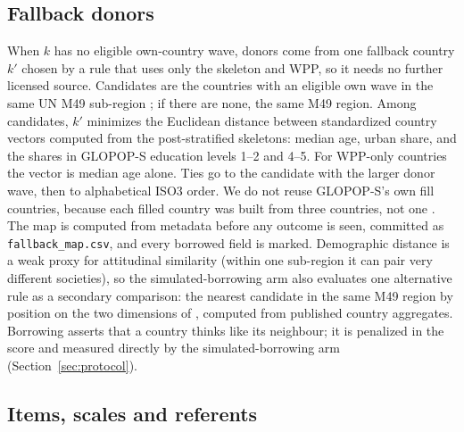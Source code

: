 \documentclass[10pt]{article}
\begin{document}
\subsection{Fallback donors}
\label{sec:fallback}

When $k$ has no eligible own-country wave, donors come from one fallback country $k'$ chosen by a rule that uses only the skeleton and WPP, so it needs no further licensed source. Candidates are the countries with an eligible own wave in the same UN M49 sub-region \citep{m49}; if there are none, the same M49 region. Among candidates, $k'$ minimizes the Euclidean distance between standardized country vectors computed from the post-stratified skeletons: median age, urban share, and the shares in GLOPOP-S education levels 1--2 and 4--5. For WPP-only countries the vector is median age alone. Ties go to the candidate with the larger donor wave, then to alphabetical ISO3 order. We do not reuse GLOPOP-S's own fill countries, because each filled country was built from three countries, not one \citep{ton2024glopop}. The map is computed from metadata before any outcome is seen, committed as \nolinkurl{fallback_map.csv}, and every borrowed field is marked. Demographic distance is a weak proxy for attitudinal similarity (within one sub-region it can pair very different societies), so the simulated-borrowing arm also evaluates one alternative rule as a secondary comparison: the nearest candidate in the same M49 region by position on the two dimensions of \citet{inglehart2005}, computed from published country aggregates. Borrowing asserts that a country thinks like its neighbour; it is penalized in the score and measured directly by the simulated-borrowing arm (Section~\ref{sec:protocol}).

\subsection{Items, scales and referents}
\label{sec:items}
\end{document}
